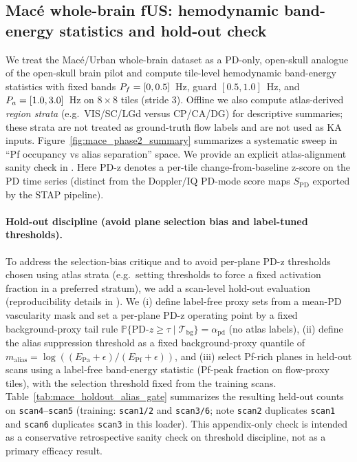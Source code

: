\subsection{Mac{\'e} whole-brain fUS: hemodynamic band-energy statistics and hold-out check}
We treat the Mac{\'e}/Urban whole-brain dataset as a PD-only, open-skull analogue of the open-skull brain pilot and compute tile-level hemodynamic band-energy statistics with fixed bands $P_f=[0,0.5]$~Hz, guard $[0.5,1.0]$~Hz, and $P_a=[1.0,3.0]$~Hz on $8\times 8$ tiles (stride 3). Offline we also compute atlas-derived \emph{region strata} (e.g.\ VIS/SC/LGd versus CP/CA/DG) for descriptive summaries; these strata are not treated as ground-truth flow labels and are not used as KA inputs. Figure~\ref{fig:mace_phase2_summary} summarizes a systematic sweep in ``Pf occupancy vs alias separation'' space. We provide an explicit atlas-alignment sanity check in .
Here PD-z denotes a per-tile change-from-baseline z-score on the PD time series (distinct from the Doppler/IQ PD-mode score maps $S_{\mathrm{PD}}$ exported by the STAP pipeline).

\paragraph{Hold-out discipline (avoid plane selection bias and label-tuned thresholds).}
To address the selection-bias critique and to avoid per-plane PD-z thresholds chosen using atlas strata (e.g.\ setting thresholds to force a fixed activation fraction in a preferred stratum), we add a scan-level hold-out evaluation (reproducibility details in ). We (i) define label-free proxy sets from a mean-PD vascularity mask and set a per-plane PD-z operating point by a fixed background-proxy tail rule $\mathbb{P}\{\mathrm{PD}\text{-}z\ge\tau\mid \mathcal{T}_{\mathrm{bg}}\}=\alpha_{\mathrm{pd}}$ (no atlas labels), (ii) define the alias suppression threshold as a fixed background-proxy quantile of $m_{\mathrm{alias}}=\log((E_{\mathrm{Pa}}+\epsilon)/(E_{\mathrm{Pf}}+\epsilon))$, and (iii) select Pf-rich planes in held-out scans using a label-free band-energy statistic (Pf-peak fraction on flow-proxy tiles), with the selection threshold fixed from the training scans. Table~\ref{tab:mace_holdout_alias_gate} summarizes the resulting held-out counts on \texttt{scan4}--\texttt{scan5} (training: \texttt{scan1/2} and \texttt{scan3/6}; note \texttt{scan2} duplicates \texttt{scan1} and \texttt{scan6} duplicates \texttt{scan3} in this loader). This appendix-only check is intended as a conservative retrospective sanity check on threshold discipline, not as a primary efficacy result.

